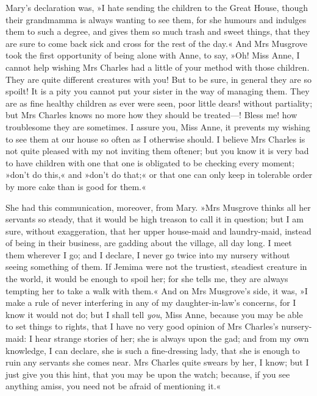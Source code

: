 Mary's declaration was, »I hate sending the children to the Great House, though their grandmamma is always wanting to see them, for she humours and indulges them to such a degree, and gives them so much trash and sweet things, that they are sure to come back sick and cross for the rest of the day.« And Mrs Musgrove took the first opportunity of being alone with Anne, to say, »Oh! Miss Anne, I cannot help wishing Mrs Charles had a little of your method with those children. They are quite different creatures with you! But to be sure, in general they are so spoilt! It is a pity you cannot put your sister in the way of managing them. They are as fine healthy children as ever were seen, poor little dears! without partiality; but Mrs Charles knows no more how they should be treated—! Bless me! how troublesome they are sometimes. I assure you, Miss Anne, it prevents my wishing to see them at our house so often as I otherwise should. I believe Mrs Charles is not quite pleased with my not inviting them oftener; but you know it is very bad to have children with one that one is obligated to be checking every moment; »don't do this,« and »don't do that;« or that one can only keep in tolerable order by more cake than is good for them.«

She had this communication, moreover, from Mary. »Mrs Musgrove thinks all her servants so steady, that it would be high treason to call it in question; but I am sure, without exaggeration, that her upper house-maid and laundry-maid, instead of being in their business, are gadding about the village, all day long. I meet them wherever I go; and I declare, I never go twice into my nursery without seeing something of them. If Jemima were not the trustiest, steadiest creature in the world, it would be enough to spoil her; for she tells me, they are always tempting her to take a walk with them.« And on Mrs Musgrove's side, it was, »I make a rule of never interfering in any of my daughter-in-law's concerns, for I know it would not do; but I shall tell \textit{you}, Miss Anne, because you may be able to set things to rights, that I have no very good opinion of Mrs Charles's nursery-maid: I hear strange stories of her; she is always upon the gad; and from my own knowledge, I can declare, she is such a fine-dressing lady, that she is enough to ruin any servants she comes near. Mrs Charles quite swears by her, I know; but I just give you this hint, that you may be upon the watch; because, if you see anything amiss, you need not be afraid of mentioning it.«


